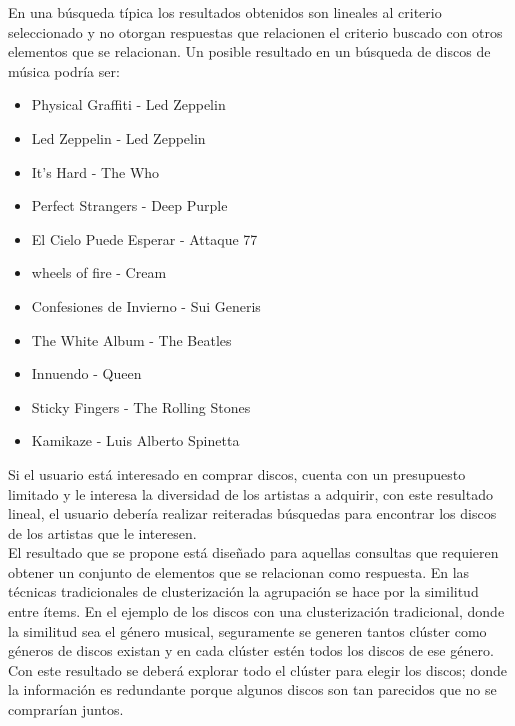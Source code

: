 En una búsqueda típica los resultados obtenidos son lineales al criterio seleccionado y no otorgan respuestas que relacionen el criterio buscado con otros elementos que se relacionan. Un posible resultado en un búsqueda de discos de música podría ser:\\
\begin{itemize}
  \item Physical Graffiti - Led Zeppelin
  \item Led Zeppelin - Led Zeppelin
  \item It's Hard - The Who
  \item Perfect Strangers - Deep Purple
  \item El Cielo Puede Esperar - Attaque 77
  \item wheels of fire - Cream
  \item Confesiones de Invierno - Sui Generis
  \item The White Album - The Beatles
  \item Innuendo - Queen
  \item Sticky Fingers - The Rolling Stones
  \item Kamikaze - Luis Alberto Spinetta
\end{itemize}

Si el usuario está interesado en comprar discos, cuenta con un presupuesto limitado y le interesa la diversidad de los artistas a adquirir, con este resultado lineal, el usuario debería realizar reiteradas búsquedas para encontrar los discos de los artistas que le interesen.\\

El resultado que se propone está diseñado para aquellas consultas que requieren obtener un conjunto de elementos que se relacionan como respuesta. En las técnicas tradicionales de clusterización la agrupación se hace por la similitud entre ítems. En el ejemplo de los discos con una clusterización tradicional, donde la similitud sea el género musical, seguramente se generen tantos clúster como géneros de discos existan y en cada clúster estén todos los discos de ese género. Con este resultado se deberá explorar todo el clúster para elegir los discos; donde la información es redundante porque algunos discos son tan parecidos que no se comprarían juntos.\\

